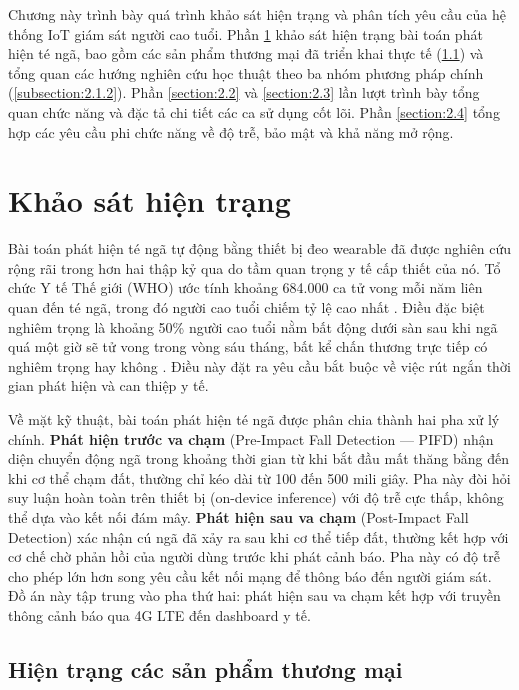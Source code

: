 \documentclass[../DoAn.tex]{subfiles}
\begin{document}
Chương này trình bày quá trình khảo sát hiện trạng và phân tích yêu cầu của hệ thống IoT giám sát người cao tuổi. Phần \ref{section:2.1} khảo sát hiện trạng bài toán phát hiện té ngã, bao gồm các sản phẩm thương mại đã triển khai thực tế (\ref{subsection:2.1.1}) và tổng quan các hướng nghiên cứu học thuật theo ba nhóm phương pháp chính (\ref{subsection:2.1.2}). Phần \ref{section:2.2} và \ref{section:2.3} lần lượt trình bày tổng quan chức năng và đặc tả chi tiết các ca sử dụng cốt lõi. Phần \ref{section:2.4} tổng hợp các yêu cầu phi chức năng về độ trễ, bảo mật và khả năng mở rộng.

\section{Khảo sát hiện trạng}
\label{section:2.1}

Bài toán phát hiện té ngã tự động bằng thiết bị đeo wearable đã được nghiên cứu rộng rãi trong hơn hai thập kỷ qua do tầm quan trọng y tế cấp thiết của nó. Tổ chức Y tế Thế giới (WHO) ước tính khoảng 684.000 ca tử vong mỗi năm liên quan đến té ngã, trong đó người cao tuổi chiếm tỷ lệ cao nhất \cite{mekruksavanich2024resnet}. Điều đặc biệt nghiêm trọng là khoảng 50\% người cao tuổi nằm bất động dưới sàn sau khi ngã quá một giờ sẽ tử vong trong vòng sáu tháng, bất kể chấn thương trực tiếp có nghiêm trọng hay không \cite{mekruksavanich2024resnet}. Điều này đặt ra yêu cầu bắt buộc về việc rút ngắn thời gian phát hiện và can thiệp y tế.

Về mặt kỹ thuật, bài toán phát hiện té ngã được phân chia thành hai pha xử lý chính. \textbf{Phát hiện trước va chạm} (Pre-Impact Fall Detection --- PIFD) nhận diện chuyển động ngã trong khoảng thời gian từ khi bắt đầu mất thăng bằng đến khi cơ thể chạm đất, thường chỉ kéo dài từ 100 đến 500 mili giây. Pha này đòi hỏi suy luận hoàn toàn trên thiết bị (on-device inference) với độ trễ cực thấp, không thể dựa vào kết nối đám mây. \textbf{Phát hiện sau va chạm} (Post-Impact Fall Detection) xác nhận cú ngã đã xảy ra sau khi cơ thể tiếp đất, thường kết hợp với cơ chế chờ phản hồi của người dùng trước khi phát cảnh báo. Pha này có độ trễ cho phép lớn hơn song yêu cầu kết nối mạng để thông báo đến người giám sát. Đồ án này tập trung vào pha thứ hai: phát hiện sau va chạm kết hợp với truyền thông cảnh báo qua 4G LTE đến dashboard y tế.

\subsection{Hiện trạng các sản phẩm thương mại}
\label{subsection:2.1.1}
\end{document}
